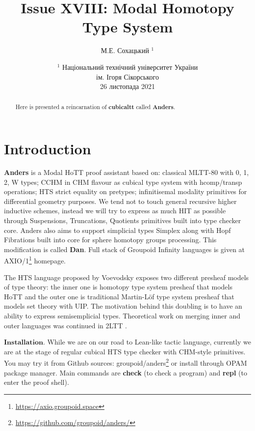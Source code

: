 \documentclass{article}
\theoremstyle{definition}
\begin{document}
\author { М.Е. Сохацький $^1$ }
\title { Issue XVIII: Modal Homotopy Type System }
\date{ \small $^1$ Національний технічний університет України \\
       ім. Ігоря Сікорського \\
       26 листопада 2021 }
\maketitle

\begin{abstract}
Here is presented a reincarnation of \textbf{cubicaltt} called \textbf{Anders}.
\end{abstract}


\tableofcontents
\newpage

\section{Introduction}

\textbf{Anders} is a Modal HoTT proof assistant based on: classical MLTT-80 \cite{MLTT80}
with 0, 1, 2, W types; CCHM \cite{CCHM} in CHM \cite{CHM} flavour as cubical type system with
hcomp/transp operations; HTS \cite{HTS} strict equality on pretypes;
infinitisemal \cite{deRham} modality primitives for differential geometry purposes.
We tend not to touch general recursive higher inductive schemes,
instead we will try to express as much HIT as possible through Suspensions, Truncations,
Quotients primitives built into type checker core.
Anders also aims to support simplicial types Simplex along with Hopf Fibrations
built into core for sphere homotopy groups processing. This modification is called \textbf{Dan}.
Full stack of Groupoid Infinity languages is given at AXIO/1\footnote{\url{https://axio.groupoid.space}} homepage.

The HTS language proposed by Voevodsky exposes two different presheaf models of type theory:
the inner one is homotopy type system presheaf that models HoTT and the outer one is
traditional Martin-Löf type system presheaf that models set theory with UIP.
The motivation behind this doubling is to have an ability to express semisemplicial types.
Theoretical work on merging inner and outer languages was continued in 2LTT \cite{2LTT}.

$\mathbf{Installation}$. While we are on our road to Lean-like tactic language, currently we are at the stage of
regular cubical HTS type checker with CHM-style primitives. You may try it from Github
sources: groupoid/anders\footnote{\url{https://github.com/groupoid/anders/}} or install
through OPAM package manager. Main commands are \textbf{check} (to check a program)
and \textbf{repl} (to enter the proof shell).
\end{document}
